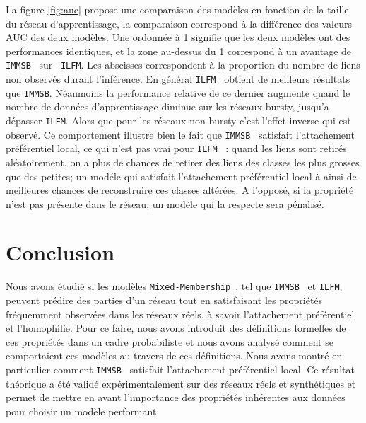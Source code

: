 \documentclass[french]{hermes-journal}
\newcommand{\ilfm}{\texttt{ILFM}}
\newcommand{\immsb}{\texttt{IMMSB}}
\newcommand{\mmm}{\texttt{Mixed-Membership}~}
\begin{document}
La figure \ref{fig:auc} propose une comparaison des modèles en fonction de la taille du réseau d'apprentissage, la comparaison correspond à la différence des valeurs AUC des deux modèles. Une ordonnée à 1 signifie que les deux modèles ont des performances identiques, et la zone au-dessus du 1 correspond à un avantage de \immsb~ sur ~\ilfm. Les abscisses correspondent à la proportion du nombre de liens non observés durant l'inférence. En général \ilfm~ obtient de meilleurs résultats que \immsb. Néanmoins la performance relative de ce dernier augmente quand le nombre de données d'apprentissage diminue sur les réseaux bursty, jusqu'a dépasser \ilfm. Alors que pour les réseaux non bursty c'est l'effet inverse qui est observé. Ce comportement illustre bien le fait que \immsb~ satisfait l'attachement préférentiel local, ce qui n'est pas vrai pour  \ilfm~ : quand les liens sont retirés aléatoirement, on a plus de chances de retirer des liens des classes les plus grosses que des petites; un modéle qui satisfait l'attachement préférentiel local à ainsi de meilleures chances de reconstruire ces classes altérées. A l'opposé, si la propriété n'est pas présente dans le réseau, un modèle qui la respecte sera pénalisé.

\section{Conclusion}

Nous avons étudié si les modèles \mmm, tel que \immsb~ et \ilfm, peuvent prédire des parties d'un réseau tout en satisfaisant les propriétés fréquemment observées dans les réseaux réels, à savoir l'attachement préférentiel et l'homophilie. Pour ce faire, nous avons introduit des définitions formelles de ces propriétés dans un cadre probabiliste et nous avons analysé comment se comportaient ces modèles au travers de ces définitions. Nous avons montré en particulier comment \immsb~ satisfait l'attachement préférentiel local. Ce résultat théorique a été validé expérimentalement sur des réseaux réels et synthétiques et permet de mettre en avant l'importance des propriétés inhérentes aux données pour choisir un modèle performant.












%

\end{document}
